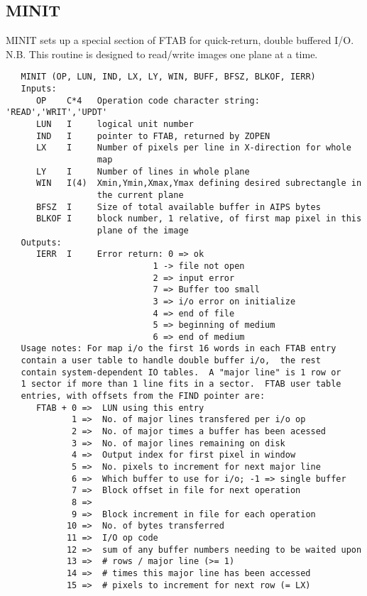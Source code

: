 \subsection{MINIT}
MINIT sets up a special section of FTAB for quick-return, double
buffered I/O.  N.B. This routine is designed to read/write images
one plane at a time.
\begin{verbatim}
   MINIT (OP, LUN, IND, LX, LY, WIN, BUFF, BFSZ, BLKOF, IERR)
   Inputs:
      OP    C*4   Operation code character string: 'READ','WRIT','UPDT'
      LUN   I     logical unit number
      IND   I     pointer to FTAB, returned by ZOPEN
      LX    I     Number of pixels per line in X-direction for whole
                  map
      LY    I     Number of lines in whole plane
      WIN   I(4)  Xmin,Ymin,Xmax,Ymax defining desired subrectangle in
                  the current plane
      BFSZ  I     Size of total available buffer in AIPS bytes
      BLKOF I     block number, 1 relative, of first map pixel in this
                  plane of the image
   Outputs:
      IERR  I     Error return: 0 => ok
                             1 -> file not open
                             2 => input error
                             7 => Buffer too small
                             3 => i/o error on initialize
                             4 => end of file
                             5 => beginning of medium
                             6 => end of medium
   Usage notes: For map i/o the first 16 words in each FTAB entry
   contain a user table to handle double buffer i/o,  the rest
   contain system-dependent IO tables.  A "major line" is 1 row or
   1 sector if more than 1 line fits in a sector.  FTAB user table
   entries, with offsets from the FIND pointer are:
      FTAB + 0 =>  LUN using this entry
             1 =>  No. of major lines transfered per i/o op
             2 =>  No. of major times a buffer has been acessed
             3 =>  No. of major lines remaining on disk
             4 =>  Output index for first pixel in window
             5 =>  No. pixels to increment for next major line
             6 =>  Which buffer to use for i/o; -1 => single buffer
             7 =>  Block offset in file for next operation
             8 =>
             9 =>  Block increment in file for each operation
            10 =>  No. of bytes transferred
            11 =>  I/O op code
            12 =>  sum of any buffer numbers needing to be waited upon
            13 =>  # rows / major line (>= 1)
            14 =>  # times this major line has been accessed
            15 =>  # pixels to increment for next row (= LX)
\end{verbatim}

